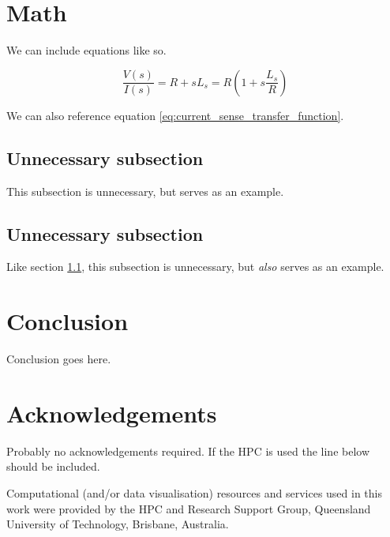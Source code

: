 \documentclass[conference]{IEEEtran}
\begin{document}
\section{Math}

We can include equations like so.

\begin{equation} \label{eq:current_sense_transfer_function}
	\frac{V(s)}{I(s)} = R + sL_s = R\left(1 + s\frac{L_s}{R}\right)
\end{equation}

We can also reference equation \ref{eq:current_sense_transfer_function}.

	\subsection{Unnecessary subsection}
	\label{sec:unnecessary}

	This subsection is unnecessary, but serves as an example.
	
	\subsection{Unnecessary subsection}

	Like section \ref{sec:unnecessary}, this subsection is unnecessary, but \textit{also} serves as an example.

\section{Conclusion}

Conclusion goes here.


\section*{Acknowledgements}

Probably no acknowledgements required. If the HPC is used the line below should be included.

Computational (and/or data visualisation) resources and services used in this work were provided by the HPC and Research Support Group, Queensland University of Technology, Brisbane, Australia.




\end{document}
